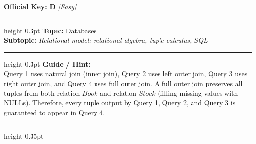 \documentclass[a4paper,10pt]{article}
\begin{document}
\begin{tcolorbox}
\textbf{Official Key:} \textbf{\large D} \hfill \textit{\small [Easy]}
\vspace{2pt}\hrule height 0.3pt\vspace{3pt}
\textbf{Topic:} Databases \\
\textbf{Subtopic:} \textit{Relational model: relational algebra, tuple calculus, SQL}
\vspace{2pt}\hrule height 0.3pt\vspace{3pt}
\textbf{Guide / Hint:} \\
{\small Query 1 uses natural join (inner join), Query 2 uses left outer join, Query 3 uses right outer join, and Query 4 uses full outer join. A full outer join preserves all tuples from both relation $Book$ and relation $Stock$ (filling missing values with NULLs). Therefore, every tuple output by Query 1, Query 2, and Query 3 is guaranteed to appear in Query 4.}

\end{tcolorbox}
\vspace{6pt}\hrule height 0.35pt\vspace{6pt}
\noindent
\end{document}
